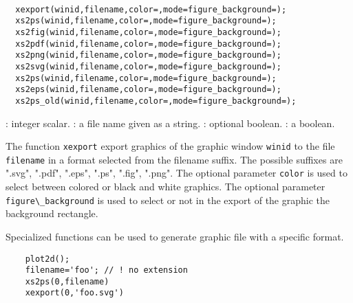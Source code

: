 
\begin{mandesc}
  \\ %
\end{mandesc}
\begin{calling_sequence}
\begin{verbatim}
  xexport(winid,filename,color=,mode=figure_background=);
  xs2ps(winid,filename,color=,mode=figure_background=);
  xs2fig(winid,filename,color=,mode=figure_background=);
  xs2pdf(winid,filename,color=,mode=figure_background=);
  xs2png(winid,filename,color=,mode=figure_background=);
  xs2svg(winid,filename,color=,mode=figure_background=);
  xs2ps(winid,filename,color=,mode=figure_background=);
  xs2eps(winid,filename,color=,mode=figure_background=);
  xs2ps_old(winid,filename,color=,mode=figure_background=);
\end{verbatim}
\end{calling_sequence}
\begin{parameters}
  \begin{varlist}
    : integer scalar.
    : a file name given as a string.
    : optional boolean. 
    : a boolean. 
  \end{varlist}
\end{parameters}
\begin{mandescription}
  The function \verb!xexport! export graphics of the graphic window \verb!winid! to 
  the file \verb!filename! in a format selected from the filename suffix. 
  The possible suffixes are ".svg", ".pdf", ".eps", ".ps", ".fig", ".png". 
  The optional parameter \verb!color! is used to select between colored or black and 
  white graphics. The optional parameter \verb!figure\_background! is used to select 
  or not in the export of the graphic the background rectangle. 

  Specialized functions can be used to generate graphic file with a specific format. 
\end{mandescription}
\begin{examples}
  \begin{Verbatim} 
    plot2d();
    filename='foo'; // ! no extension
    xs2ps(0,filename)
    xexport(0,'foo.svg')
  \end{Verbatim}
\end{examples}



